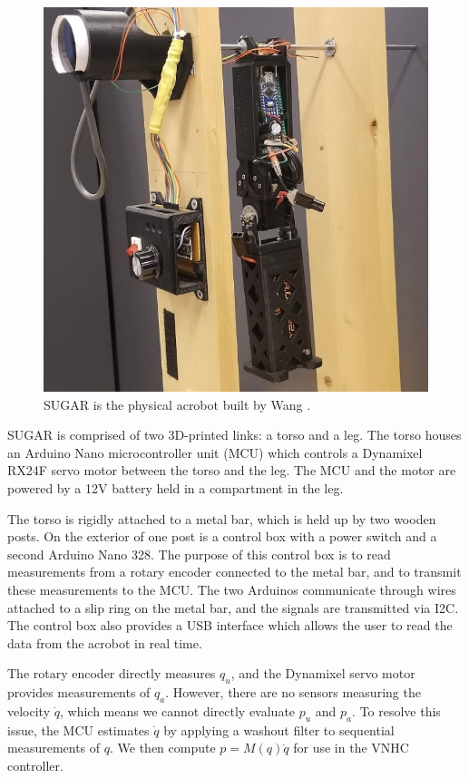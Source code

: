 \documentclass[journal,twoside,web, twocolumn,draftcls]{ieeecolor}
\begin{document}
\begin{figure}
    \centering
    \includegraphics[width=0.9\linewidth]{xingbo_acrobot.jpg}
    \caption{SUGAR is the physical acrobot built by Wang \cite{xingbo_thesis}.}
    \label{fig:xingbo-acrobot}
\end{figure}

SUGAR is comprised of two 3D-printed links: a torso and a leg.
The torso houses an Arduino Nano microcontroller unit (MCU) which controls
a Dynamixel RX24F servo motor between the torso and the leg.
The MCU and the motor are powered by a 12V battery held in a compartment
in the leg.

The torso is rigidly attached to a metal bar, which is held up by two wooden
posts.
On the exterior of one post is a control box with a power switch and a second
Arduino Nano 328.
The purpose of this control box is to read measurements from a rotary
encoder connected to the metal bar, and to transmit these measurements to the
MCU.
The two Arduinos communicate through wires attached to a slip ring on the metal
bar, and the signals are transmitted via I2C.
The control box also provides a USB interface which allows the user to read the
data from the acrobot in real time.

The rotary encoder directly measures \(q_u\), and the Dynamixel servo
motor provides measurements of \(q_a\).
However, there are no sensors measuring the velocity \(\dot{q}\), which means we cannot
directly evaluate \(p_u\) and \(p_a\).
To resolve this issue, the MCU estimates \(\dot{q}\) by applying a washout
filter to sequential measurements of \(q\).
We then compute \(p = M(q)\dot{q}\) for use in the VNHC controller.
\end{document}
